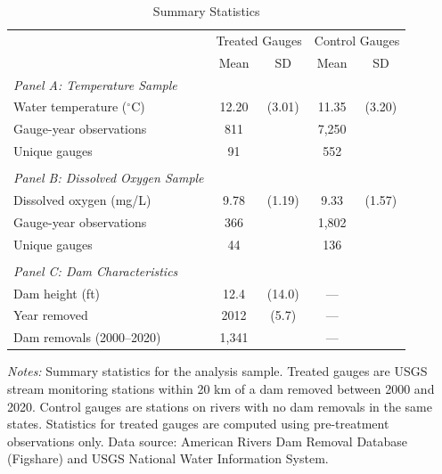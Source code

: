\begin{table}[t]
\centering
\caption{Summary Statistics}
\label{tab:sumstats}
\begin{tabular}{lcccc}
\hline\hline
 & \multicolumn{2}{c}{Treated Gauges} & \multicolumn{2}{c}{Control Gauges} \\
 & Mean & SD & Mean & SD \\
\hline
\textit{Panel A: Temperature Sample} &  &  &  &  \\
\quad Water temperature ($^{\circ}$C) & 12.20 & (3.01) & 11.35 & (3.20) \\
\quad Gauge-year observations & 811 &  & 7,250 &  \\
\quad Unique gauges & 91 &  & 552 &  \\
 \\
\textit{Panel B: Dissolved Oxygen Sample} &  &  &  &  \\
\quad Dissolved oxygen (mg/L) & 9.78 & (1.19) & 9.33 & (1.57) \\
\quad Gauge-year observations & 366 &  & 1,802 &  \\
\quad Unique gauges & 44 &  & 136 &  \\
 \\
\textit{Panel C: Dam Characteristics} &  &  &  &  \\
\quad Dam height (ft) & 12.4 & (14.0) & --- &  \\
\quad Year removed & 2012 & (5.7) & --- &  \\
\quad Dam removals (2000--2020) & 1,341 &  & --- &  \\
\hline\hline
\end{tabular}
\begin{tablenotes}
\small
\item \textit{Notes:} Summary statistics for the analysis sample. Treated gauges are USGS stream monitoring stations within 20 km of a dam removed between 2000 and 2020. Control gauges are stations on rivers with no dam removals in the same states. Statistics for treated gauges are computed using pre-treatment observations only. Data source: American Rivers Dam Removal Database (Figshare) and USGS National Water Information System.
\end{tablenotes}
\end{table}

